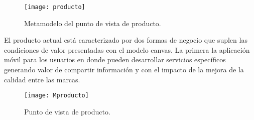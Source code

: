 \begin{figure}[H]
\centering
\texttt{[image: producto]}
\caption{Metamodelo del punto de vista de producto.}
\end{figure}



El producto actual está caracterizado por dos formas de negocio que suplen las condiciones de valor presentadas con el modelo canvas. La primera la aplicación móvil para los usuarios en donde pueden desarrollar servicios específicos generando valor de compartir información y con el impacto de la mejora de la calidad entre las marcas.

\begin{figure}[H]
\centering
\texttt{[image: Mproducto]}
\caption{Punto de vista de producto.}
\end{figure}

